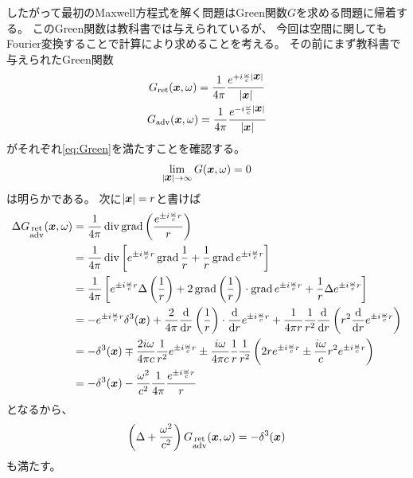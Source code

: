 \documentclass[a4paper, 10pt]{jsarticle}
\theoremstyle{definition}
\def\vec#1{\mbox{\boldmath $#1$}}
\newcommand{\dif}[2]{\frac{{\rm d} #1}{{\rm d} #2}}
\DeclareMathOperator{\Div}{div}
\DeclareMathOperator{\Grad}{grad}
\begin{document}
したがって最初のMaxwell方程式を解く問題はGreen関数$G$を求める問題に帰着する。
このGreen関数は教科書では与えられているが、
今回は空間に関してもFourier変換することで計算により求めることを考える。
その前にまず教科書で与えられたGreen関数
\begin{gather}
	G_{\rm ret}(\vec{x}, \omega) = \frac{1}{4\pi}
	\frac{e^{+i \frac{\omega}{c}|\vec{x}|}}{|\vec{x}|} \\
	G_{\rm adv}(\vec{x}, \omega) = \frac{1}{4\pi}
	\frac{e^{-i \frac{\omega}{c}|\vec{x}|}}{|\vec{x}|}
\end{gather}
がそれぞれ\eqref{eq:Green}を満たすことを確認する。
\begin{align}
	\lim_{|\vec{x}| \to \infty} G(\vec{x}, \omega) = 0
\end{align}
は明らかである。
次に$|\vec{x}| = r$と書けば
\begin{align}
	\Delta G_{\substack{\rm ret \\ \rm adv}}(\vec{x}, \omega)
	&= \frac{1}{4\pi} \Div \Grad
	\left( \frac{e^{\pm i \frac{\omega}{c} r}}{r} \right) \\
	&= \frac{1}{4\pi} \Div \left[
	e^{\pm i \frac{\omega}{c} r} \Grad \frac{1}{r} 
	+ \frac{1}{r} \Grad e^{\pm i \frac{\omega}{c} r} \right] \\
	&= \frac{1}{4\pi} \left[ e^{\pm i \frac{\omega}{c} r}
	\Delta \left( \frac{1}{r} \right)
	+ 2 \Grad \left( \frac{1}{r} \right) \cdot
	\Grad e^{\pm i \frac{\omega}{c} r} + \frac{1}{r}
	\Delta e^{\pm i \frac{\omega}{c} r} \right] \\
	&= - e^{\pm i \frac{\omega}{c} r} \delta^3(\vec{x})
	+ \frac{2}{4\pi} \dif{}{r} \left( \frac{1}{r} \right) \cdot
	\dif{}{r} e^{\pm i \frac{\omega}{c} r}
	+ \frac{1}{4\pi r} \frac{1}{r^2}
	\dif{}{r} \left(r^2 \dif{}{r} e^{\pm i \frac{\omega}{c} r} \right) \\
	&= -\delta^3(\vec{x})
	\mp \frac{2i\omega}{4\pi c} \frac{1}{r^2} e^{\pm i \frac{\omega}{c} r}
	\pm \frac{i \omega}{4\pi c} \frac{1}{r} \frac{1}{r^2} \left(
	2r e^{\pm i \frac{\omega}{c} r} \pm \frac{i\omega}{c} r^2
	e^{\pm i \frac{\omega}{c} r} \right) \\
	&= -\delta^3(\vec{x})
	- \frac{\omega^2}{c^2} \frac{1}{4\pi} \frac{e^{\pm i \frac{\omega}{c} r}}{r}
\end{align}
となるから、
\begin{align}
	\left( \Delta + \frac{\omega^2}{c^2} \right)
	G_{\substack{\rm ret \\ \rm adv}} (\vec{x}, \omega)
	= -\delta^3(\vec{x})
\end{align}
も満たす。
\end{document}
